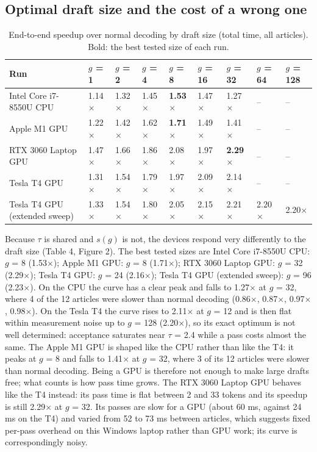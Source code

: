 \documentclass[11pt,a4paper]{article}
\begin{document}
\subsection{Optimal draft size and the cost of a wrong one}
\begin{table}[tbp]
\centering
\small
\caption{End-to-end speedup over normal decoding by draft size (total time, all articles). Bold: the best tested size of each run.}
\setlength{\tabcolsep}{4pt}
\begin{tabular}{L{2.89cm}L{1.34cm}L{1.34cm}L{1.34cm}L{1.34cm}L{1.34cm}L{1.34cm}L{1.34cm}L{1.34cm}}
\toprule
\textbf{Run} & \textbf{$g$ = 1} & \textbf{$g$ = 2} & \textbf{$g$ = 4} & \textbf{$g$ = 8} & \textbf{$g$ = 16} & \textbf{$g$ = 32} & \textbf{$g$ = 64} & \textbf{$g$ = 128} \\
\midrule
Intel Core i7-8550U CPU & 1.14$\times$ & 1.32$\times$ & 1.45$\times$ & \textbf{1.53$\times$} & 1.47$\times$ & 1.27$\times$ & -- & -- \\
Apple M1 GPU & 1.22$\times$ & 1.42$\times$ & 1.62$\times$ & \textbf{1.71$\times$} & 1.49$\times$ & 1.41$\times$ & -- & -- \\
RTX 3060 Laptop GPU & 1.47$\times$ & 1.66$\times$ & 1.86$\times$ & 2.08$\times$ & 1.97$\times$ & \textbf{2.29$\times$} & -- & -- \\
Tesla T4 GPU & 1.31$\times$ & 1.54$\times$ & 1.79$\times$ & 1.97$\times$ & 2.09$\times$ & 2.14$\times$ & -- & -- \\
Tesla T4 GPU (extended sweep) & 1.33$\times$ & 1.54$\times$ & 1.80$\times$ & 2.05$\times$ & 2.15$\times$ & 2.21$\times$ & 2.20$\times$ & 2.20$\times$ \\
\bottomrule
\end{tabular}
\end{table}
Because $\tau$ is shared and $s(g)$ is not, the devices respond very differently to the draft size (Table 4, Figure 2). The best tested sizes are Intel Core i7-8550U CPU: $g$ = 8 (1.53$\times$); Apple M1 GPU: $g$ = 8 (1.71$\times$); RTX 3060 Laptop GPU: $g$ = 32 (2.29$\times$); Tesla T4 GPU: $g$ = 24 (2.16$\times$); Tesla T4 GPU (extended sweep): $g$ = 96 (2.23$\times$). On the CPU the curve has a clear peak and falls to 1.27$\times$ at $g$ = 32, where 4 of the 12 articles were slower than normal decoding (0.86$\times$, 0.87$\times$, 0.97$\times$, 0.98$\times$). On the Tesla T4 the curve rises to 2.11$\times$ at $g$ = 12 and is then flat within measurement noise up to $g$ = 128 (2.20$\times$), so its exact optimum is not well determined: acceptance saturates near $\tau$ = 2.4 while a pass costs almost the same. The Apple M1 GPU is shaped like the CPU rather than like the T4: it peaks at $g$ = 8 and falls to 1.41$\times$ at $g$ = 32, where 3 of its 12 articles were slower than normal decoding. Being a GPU is therefore not enough to make large drafts free; what counts is how pass time grows. The RTX 3060 Laptop GPU behaves like the T4 instead: its pass time is flat between 2 and 33 tokens and its speedup is still 2.29$\times$ at $g$ = 32. Its passes are slow for a GPU (about 60 ms, against 24 ms on the T4) and varied from 52 to 73 ms between articles, which suggests fixed per-pass overhead on this Windows laptop rather than GPU work; its curve is correspondingly noisy.
\end{document}
